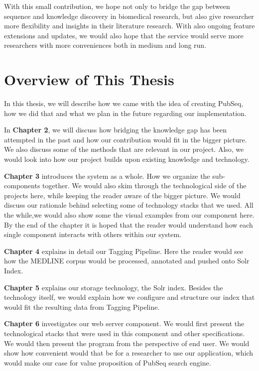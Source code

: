 With this small contribution, we hope not only to bridge the gap between sequence and knowledge discovery in biomedical research, but also give researcher more flexibility and insights in their literature research. With also ongoing feature extensions and updates, we would also hope that the service would serve more researchers with more conveniences both in medium and long run.

\section{Overview of This Thesis}

In this thesis, we will describe how we came with the idea of creating PubSeq, how we did that and what we plan in the future regarding our implementation.

In \textbf{Chapter 2}, we will discuss how bridging the knowledge gap has been attempted in the past and how our contribution would fit in the bigger picture. We also discuss some of the methods that are relevant in our project. Also, we would look into how our project builds upon existing knowledge and technology.

\textbf{Chapter 3} introduces the system as a whole. How we organize the sub-components together. We would also skim through the technological side of the projects here, while keeping the reader aware of the bigger picture. We would discuss our rationale behind selecting some of technology stacks that we used. All the while,we would also show some the visual examples from our component here. By the end of the chapter it is hoped that the reader would understand how each single component interacts with others within our system.

\textbf{Chapter 4} explains in detail our Tagging Pipeline. Here the reader would see how the MEDLINE corpus would be processed, annotated and pushed onto Solr Index.

\textbf{Chapter 5} explains our storage technology, the Solr index. Besides the technology itself, we would explain how we configure and structure our index that would fit the resulting data from Tagging Pipeline.

\textbf{Chapter 6} investigates our web server component. We would first present the technological stacks that were used in this component and other specifications. We would then present the program from the perspective of end user. We would show how convenient would that be for a researcher to use our application, which would make our case for value proposition of PubSeq search engine.

